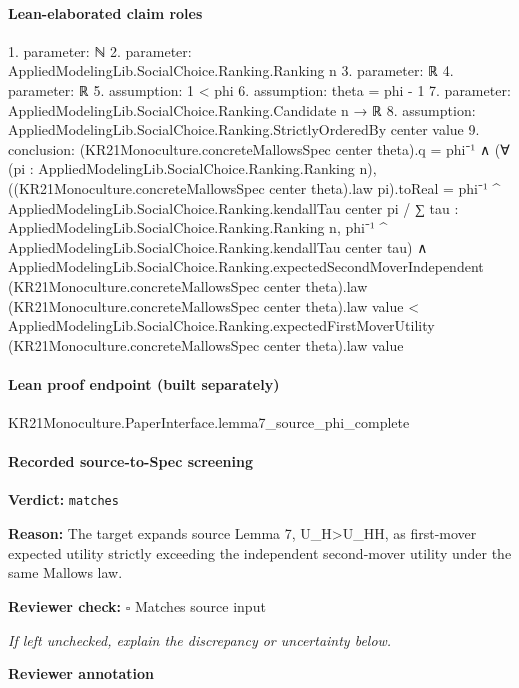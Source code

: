 \documentclass[10pt]{article}
\newcommand{\reviewerbox}{%
  \par\noindent\fbox{\parbox{0.96\linewidth}{\rule{0pt}{0.38in}}}\par
}
\newcommand{\reviewmatch}[1]{%
  \par\noindent\textbf{Reviewer check:} $\square$\; #1\par
  \noindent\emph{If left unchecked, explain the discrepancy or uncertainty below.}\par
}
\begin{document}
\paragraph{Lean-elaborated claim roles}\begin{ReviewVerbatim}
1. parameter: ℕ
2. parameter: AppliedModelingLib.SocialChoice.Ranking.Ranking n
3. parameter: ℝ
4. parameter: ℝ
5. assumption: 1 < phi
6. assumption: theta = phi - 1
7. parameter: AppliedModelingLib.SocialChoice.Ranking.Candidate n → ℝ
8. assumption: AppliedModelingLib.SocialChoice.Ranking.StrictlyOrderedBy center value
9. conclusion: (KR21Monoculture.concreteMallowsSpec center theta).q = phi⁻¹ ∧
  (∀ (pi : AppliedModelingLib.SocialChoice.Ranking.Ranking n),
      ((KR21Monoculture.concreteMallowsSpec center theta).law pi).toReal =
        phi⁻¹ ^ AppliedModelingLib.SocialChoice.Ranking.kendallTau center pi /
          ∑ tau : AppliedModelingLib.SocialChoice.Ranking.Ranking n,
            phi⁻¹ ^ AppliedModelingLib.SocialChoice.Ranking.kendallTau center tau) ∧
    AppliedModelingLib.SocialChoice.Ranking.expectedSecondMoverIndependent
        (KR21Monoculture.concreteMallowsSpec center theta).law (KR21Monoculture.concreteMallowsSpec center theta).law
        value <
      AppliedModelingLib.SocialChoice.Ranking.expectedFirstMoverUtility
        (KR21Monoculture.concreteMallowsSpec center theta).law value
\end{ReviewVerbatim}

\paragraph{Lean proof endpoint (built separately)}\begin{ReviewVerbatim}
KR21Monoculture.PaperInterface.lemma7_source_phi_complete
\end{ReviewVerbatim}

\paragraph{Recorded source-to-Spec screening}
\textbf{Verdict:} \texttt{matches}
\\
{\raggedright
\textbf{Reason:} The target expands source Lemma 7, U\_\allowbreak{}H>U\_\allowbreak{}HH, as first-\allowbreak{}mover expected utility strictly exceeding the independent second-\allowbreak{}mover utility under the same Mallows law.\allowbreak{}
\par}
\reviewmatch{Matches source input}
\noindent\textbf{Reviewer annotation}\par
\reviewerbox
\clearpage
\hypertarget{source-claim-961880e0b1d1c772}{}
\end{document}
